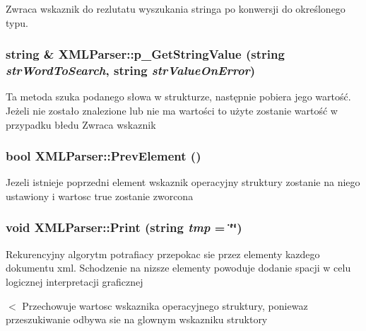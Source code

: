 Zwraca wskaznik do rezlutatu wyszukania stringa po konwersji do określonego typu. 

\hypertarget{classXMLParser_aaf87e1c22bbd0b91b2facef25f4b5965}{
\subsubsection[{p\_\-GetStringValue}]{\setlength{\rightskip}{0pt plus 5cm}string \& XMLParser::p\_\-GetStringValue (string {\em strWordToSearch}, \/  string {\em strValueOnError})}}
\label{classXMLParser_aaf87e1c22bbd0b91b2facef25f4b5965}


Ta metoda szuka podanego słowa w strukturze, następnie pobiera jego wartość. Jeżeli nie zostało znalezione lub nie ma wartości to użyte zostanie wartość w przypadku błedu Zwraca wskaznik

\hypertarget{classXMLParser_a5a860f3cc8d9f72ffbb062683f9c2e18}{
\subsubsection[{PrevElement}]{\setlength{\rightskip}{0pt plus 5cm}bool XMLParser::PrevElement ()}}
\label{classXMLParser_a5a860f3cc8d9f72ffbb062683f9c2e18}


Jezeli istnieje poprzedni element wskaznik operacyjny struktury zostanie na niego ustawiony i wartosc true zostanie zworcona 

\hypertarget{classXMLParser_a29bc5cb3c6c35cdc5020df21a8f9ad28}{
\subsubsection[{Print}]{\setlength{\rightskip}{0pt plus 5cm}void XMLParser::Print (string {\em tmp} = {\ttfamily \char`\"{}\char`\"{}})}}
\label{classXMLParser_a29bc5cb3c6c35cdc5020df21a8f9ad28}


Rekurencyjny algorytm potrafiacy przepokac sie przez elementy kazdego dokumentu xml. Schodzenie na nizsze elementy powoduje dodanie spacji w celu logicznej interpretacji graficznej

$<$ Przechowuje wartosc wskaznika operacyjnego struktury, poniewaz przeszukiwanie odbywa sie na glownym wskazniku struktory 

